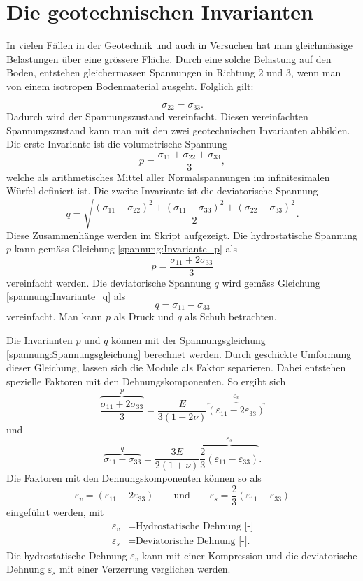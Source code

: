 \section{Die geotechnischen Invarianten\label{spannung:section:Die geotechnischen Invarianten}}
In vielen Fällen in der Geotechnik und auch in Versuchen hat man gleichmässige Belastungen über eine grössere Fläche.
Durch eine solche Belastung auf den Boden, entstehen gleichermassen Spannungen in Richtung $2$ und $3$,
wenn man von einem isotropen Bodenmaterial ausgeht.
Folglich gilt:

\[
\sigma_{22}
=
\sigma_{33}
.
\]
Dadurch wird der Spannungszustand vereinfacht.
Diesen vereinfachten Spannungszustand kann man mit den zwei geotechnischen Invarianten abbilden.
Die erste Invariante ist die volumetrische Spannung
\begin{equation}
p
=
\frac{\sigma_{11}+\sigma_{22}+\sigma_{33}}{3}
\label{spannung:Invariante_p}
,
\end{equation}
welche als arithmetisches Mittel aller Normalspannungen im infinitesimalen Würfel definiert ist.
Die zweite Invariante ist die deviatorische Spannung
\begin{equation}
q
=
\sqrt{\frac{(\sigma_{11}-\sigma_{22})^{2}+(\sigma_{11}-\sigma_{33})^{2}+(\sigma_{22}-\sigma_{33})^{2}}{2}}
\label{spannung:Invariante_q}
.
\end{equation}
Diese Zusammenhänge werden im Skript \cite{spannung:Stoffgesetze-und-numerische-Modellierung-in-der-Geotechnik} aufgezeigt.
Die hydrostatische Spannung $p$ kann gemäss Gleichung \eqref{spannung:Invariante_p} als
\[
p
=
\frac{\sigma_{11}+2\sigma_{33}}{3}
\]
vereinfacht werden.
Die deviatorische Spannung $q$ wird gemäss Gleichung \eqref{spannung:Invariante_q} als
\[
q
=
\sigma_{11}-\sigma_{33}
\]
vereinfacht. Man kann $p$ als Druck und $q$ als Schub betrachten.

Die Invarianten $p$ und $q$ können mit der Spannungsgleichung \eqref{spannung:Spannungsgleichung} berechnet werden.
Durch geschickte Umformung dieser Gleichung, lassen sich die Module als Faktor separieren.
Dabei entstehen spezielle Faktoren mit den Dehnungskomponenten.
So ergibt sich
\[
\overbrace{\frac{\sigma_{11}+2\sigma_{33}}{3}}^{\displaystyle{p}}
=
\frac{E}{3(1-2\nu)} \overbrace{(\varepsilon_{11} - 2\varepsilon_{33})}^{\displaystyle{{\varepsilon_{v}}}}
\]
und
\[
\overbrace{\sigma_{11}-\sigma_{33}}^{\displaystyle{q}}
=
\frac{3E}{2(1+\nu)} \overbrace{\frac{2}{3}(\varepsilon_{11} - \varepsilon_{33})}^{\displaystyle{\varepsilon_{s}}}
.
\]
Die Faktoren mit den Dehnungskomponenten können so als
\[
\varepsilon_{v}
=
(\varepsilon_{11} - 2\varepsilon_{33})
\qquad
\text{und}
\qquad
\varepsilon_{s}
=
\frac{2}{3}(\varepsilon_{11} - \varepsilon_{33})
\]
eingeführt werden, mit
\begin{align*}
	\varepsilon_{v} &= \text{Hydrostatische Dehnung [-]} \\
	\varepsilon_{s} &= \text{Deviatorische Dehnung [-].}
\end{align*}
Die hydrostatische Dehnung $\varepsilon_{v}$ kann mit einer Kompression und
die deviatorische Dehnung $\varepsilon_{s}$  mit einer Verzerrung verglichen werden.

